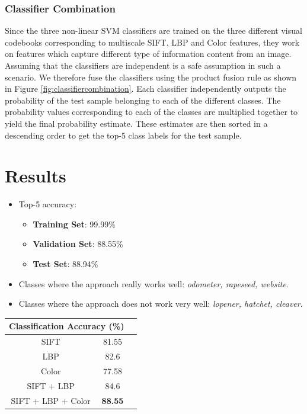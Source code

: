 \documentclass[12pt]{article}
\begin{document}
\subsubsection{Classifier Combination}
Since the three non-linear SVM classifiers are trained on the three different visual codebooks corresponding to multiscale SIFT, LBP and Color features, they work on features which capture different type of information content from an image. Assuming that the classifiers are independent is a safe assumption in such a scenario. We therefore fuse the classifiers using the product fusion rule as shown in Figure \ref{fig:classifiercombination}. Each classifier independently outputs the probability of the test sample belonging to each of the different classes. The probability values corresponding to each of the classes are multiplied together to yield the final probability estimate. These estimates are then sorted in a descending order to get the top-5 class labels for the test sample.

\section{Results}
\begin{itemize}
\item Top-5 accuracy:
\begin{itemize}
\item \textbf{Training Set}: 99.99\%
\item \textbf{Validation Set}: 88.55\%
\item \textbf{Test Set}: 88.94\%
\end{itemize}
\item Classes where the approach really works well: \textit{odometer, rapeseed, website}.
\item Classes where the approach does not work very well: \textit{lopener, hatchet, cleaver}.
\end{itemize}

\begin{center}
\begin{tabular}[]{| c | c | c | }
\hline
\multicolumn{2}{|c|}{\textbf{Classification Accuracy} (\%)} \\
\hline
SIFT & 81.55\\
\hline
LBP & 82.6\\
\hline
Color & 77.58\\
\hline
SIFT + LBP & 84.6\\
\hline
SIFT + LBP + Color & \textbf{88.55}\\
\hline
\end{tabular}
\end{center}



\end{document}
